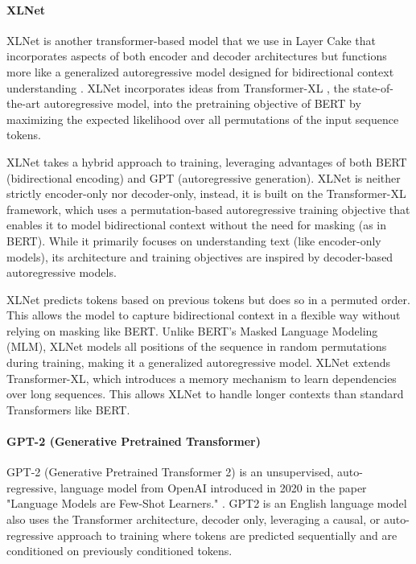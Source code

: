 \documentclass[final]{clv2025}
\begin{document}
\paragraph{XLNet}

XLNet is another transformer-based model that we use in Layer Cake that incorporates aspects of both encoder and decoder architectures but functions more like a generalized autoregressive model designed for bidirectional context understanding \cite{yang2019xlnet}. XLNet incorporates ideas from Transformer-XL \cite{dai2019transformer}, the state-of-the-art autoregressive model, into the pretraining objective of BERT by maximizing the expected likelihood over all permutations of the input sequence tokens.

XLNet takes a hybrid approach to training, leveraging advantages of both BERT (bidirectional encoding) and GPT (autoregressive generation). XLNet is neither strictly encoder-only nor decoder-only, instead, it is built on the Transformer-XL framework, which uses a permutation-based autoregressive training objective that enables it to model bidirectional context without the need for masking (as in BERT). While it primarily focuses on understanding text (like encoder-only models), its architecture and training objectives are inspired by decoder-based autoregressive models.

XLNet predicts tokens based on previous tokens but does so in a permuted order. This allows the model to capture bidirectional context in a flexible way without relying on masking like BERT. Unlike BERT's Masked Language Modeling (MLM), XLNet models all positions of the sequence in random permutations during training, making it a generalized autoregressive model. XLNet extends Transformer-XL, which introduces a memory mechanism to learn dependencies over long sequences. This allows XLNet to handle longer contexts than standard Transformers like BERT.

\paragraph{GPT-2 (Generative Pretrained Transformer)}

GPT-2 (Generative Pretrained Transformer 2) is an unsupervised, auto-regressive, language model from OpenAI introduced in 2020 in the paper "Language Models are Few-Shot Learners." \cite{articlebrown}.  GPT2 is an English language model also uses the Transformer architecture, decoder only, leveraging a causal, or auto-regressive approach to training where tokens are predicted sequentially and are conditioned on previously conditioned tokens.
\end{document}
